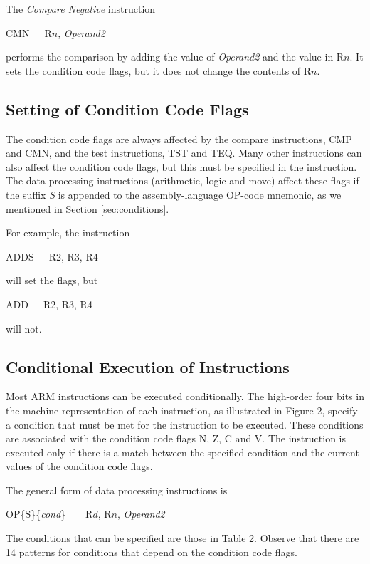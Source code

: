 \documentclass[11pt, twoside, pdftex]{article}
\begin{document}
The {\it Compare Negative} instruction
\begin{center}
		  CMN~~~R$n$, {\it Operand2}
\end{center}
\noindent 
performs the comparison by adding the value of
{\it Operand2} and the value in R$n$. It sets the condition
code flags, but it does not change the contents of R$n$.

\subsection{Setting of Condition Code Flags}
\label{sec:CCF}
\noindent 

The condition code flags are always affected by the compare
instructions, CMP and CMN, and the test instructions, 
TST and TEQ. Many other instructions can also affect the
condition code flags, but this must be specified in the
instruction. The data processing instructions (arithmetic, logic and move) affect
these flags if the suffix {\it S} is appended to the assembly-language
OP-code mnemonic, as we mentioned in Section \ref{sec:conditions}.

\noindent
For example, the instruction
\begin{center}
ADDS~~~R2, R3, R4
\end{center}
\noindent
will set the flags, but
\begin{center}
ADD~~~R2, R3, R4
\end{center}
\noindent
will not.

\subsection{Conditional Execution of Instructions}
\label{sec:cond}

Most ARM instructions can be executed conditionally. The high-order
four bits in the machine representation of each instruction,
as illustrated in Figure 2, specify a condition that must be met
for the instruction to be executed. These conditions are
associated with the condition code flags N, Z, C and V. 
The instruction is executed only if there is a match between
the specified condition and the current values of the condition
code flags.

\noindent
The general form of data processing instructions is
\begin{center}
		  OP\{S\}\{{\it cond}\}~~~~R$d$, R$n$, {\it Operand2}
\end{center}

The conditions that can be specified are those in Table 2.
Observe that there are 14 patterns for conditions that depend
on the condition code flags. 
\end{document}
